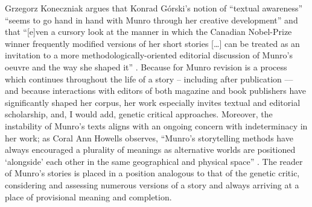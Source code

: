 \begin{paper}
Grzegorz Koneczniak argues that Konrad Górski's notion of ``textual
awareness'' ``seems to go hand in hand with Munro through her creative
development'' \citep[106]{koneczniak_works_2016} and that ``{[}e{]}ven a cursory look at the manner
in which the Canadian Nobel-Prize winner frequently modified versions of
her short stories {[}\ldots{]} can be treated as an invitation to a more
methodologically-oriented editorial discussion of Munro's oeuvre and the
way she shaped it'' \citep[105]{koneczniak_works_2016}. Because for Munro revision is a process which continues throughout the life of a story – including after publication –– and because interactions with editors of both magazine and
book publishers have significantly shaped her corpus, her work
especially invites textual and editorial scholarship, and, I would add,
genetic critical approaches. Moreover, the instability of Munro's texts
aligns with an ongoing concern with indeterminacy in her work; as Coral
Ann Howells observes, ``Munro's storytelling methods have always
encouraged a plurality of meanings as alternative worlds are positioned
`alongside' each other in the same geographical and physical space''
\citep[70]{howells_alice_1998}. The reader of Munro's stories is placed in a position analogous to
that of the genetic critic, considering and assessing numerous versions
of a story and always arriving at a place of provisional meaning and
completion.


\end{paper}
